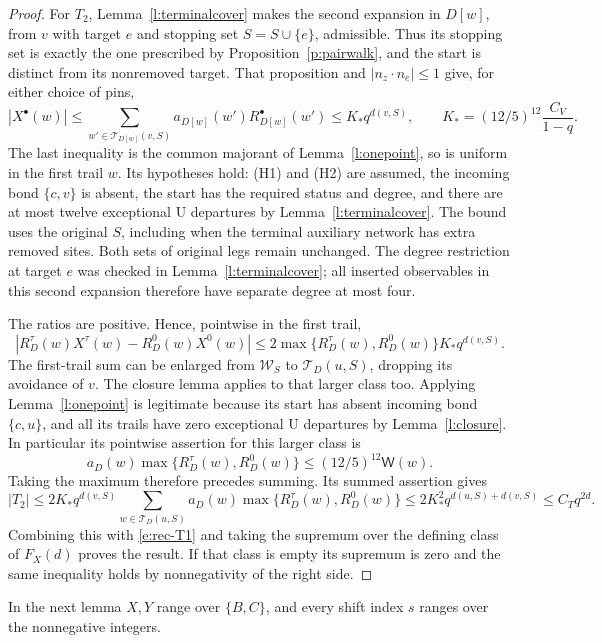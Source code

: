 \begin{proof}
For \(T_2\), Lemma~\ref{l:terminalcover} makes the second
expansion in \(D[w]\), from \(v\) with target \(e\) and
stopping set \(S=S\cup\{e\}\), admissible.  Thus its stopping
set is exactly the one prescribed by Proposition~\ref{p:pairwalk},
and the start is distinct from its nonremoved target.
That proposition
and \(|n_z\cdot n_e|\le1\) give, for either choice of pins,
\[
 |X^\bullet(w)|
 \le\sum_{w'\in\mathcal T_{D[w]}(v,S)}
                a_{D[w]}(w')R_{D[w]}^\bullet(w')
 \le K_*q^{d(v,S)},\qquad
 K_*=(12/5)^{12}\frac{C_V}{1-q}.
\]
The last inequality is the common majorant of
Lemma~\ref{l:onepoint}, so is uniform in the first trail \(w\).
Its hypotheses hold: (H1) and (H2) are assumed, the incoming
bond \(\{c,v\}\) is absent, the start has the required status
and degree, and there are at most twelve exceptional
\(\mathrm U\) departures by Lemma~\ref{l:terminalcover}.
The bound uses the original \(S\), including when the terminal
auxiliary network has extra removed sites.  Both sets of original
legs remain unchanged.  The degree restriction at target \(e\)
was checked in Lemma~\ref{l:terminalcover}; all inserted
observables in this second expansion therefore have separate
degree at most four.

The ratios are positive.  Hence, pointwise in the first trail,
\[
 |R_D^\tau(w)X^\tau(w)-R_D^0(w)X^0(w)|
    \le2\max\{R_D^\tau(w),R_D^0(w)\}K_*q^{d(v,S)}.
\]
The first-trail sum can be enlarged from \(\mathcal W_S\)
to \(\mathcal T_D(u,S)\), dropping its avoidance of \(v\).
The closure lemma applies to that larger class too.  Applying
Lemma~\ref{l:onepoint} is legitimate because its start has absent
incoming bond \(\{c,u\}\), and all its trails have zero
exceptional \(\mathrm U\) departures by Lemma~\ref{l:closure}.
In particular its pointwise assertion for this larger class is
\[
 a_D(w)\max\{R_D^\tau(w),R_D^0(w)\}
          \le(12/5)^{12}\mathsf W(w).
\]
Taking the maximum therefore precedes summing.  Its summed
assertion gives
\[
 |T_2|\le2K_*q^{d(v,S)}
       \sum_{w\in\mathcal T_D(u,S)}
           a_D(w)\max\{R_D^\tau(w),R_D^0(w)\}
 \le2K_*^2q^{d(u,S)+d(v,S)}\le C_Tq^{2d}.
\]
Combining this with \eqref{e:rec-T1} and taking the supremum
over the defining class of \(F_X(d)\) proves the result.  If
that class is empty its supremum is zero and the same inequality
holds by nonnegativity of the right side.
\end{proof}

In the next lemma \(X,Y\) range over \(\{B,C\}\), and every
shift index \(s\) ranges over the nonnegative integers.


